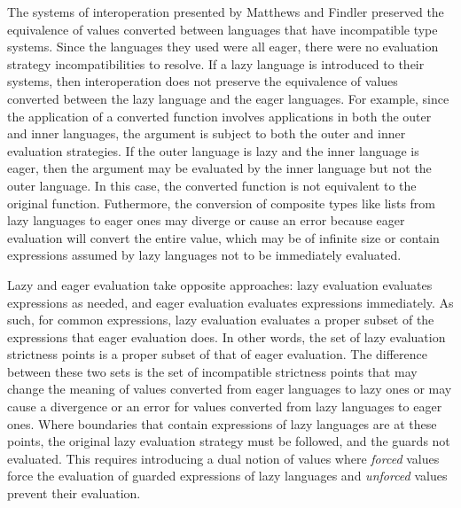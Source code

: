 The systems of interoperation presented by Matthews and Findler \cite{matthews07} preserved the equivalence of values converted between languages that have incompatible type systems. Since the languages they used were all eager, there were no evaluation strategy incompatibilities to resolve. If a lazy language is introduced to their systems, then interoperation does not preserve the equivalence of values converted between the lazy language and the eager languages. For example, since the application of a converted function involves applications in both the outer and inner languages, the argument is subject to both the outer and inner evaluation strategies. If the outer language is lazy and the inner language is eager, then the argument may be evaluated by the inner language but not the outer language. In this case, the converted function is not equivalent to the original function. Futhermore, the conversion of composite types like lists from lazy languages to eager ones may diverge or cause an error because eager evaluation will convert the entire value, which may be of infinite size or contain expressions assumed by lazy languages not to be immediately evaluated.

Lazy and eager evaluation take opposite approaches: lazy evaluation evaluates expressions as needed, and eager evaluation evaluates expressions immediately. As such, for common expressions, lazy evaluation evaluates a proper subset of the expressions that eager evaluation does. In other words, the set of lazy evaluation strictness points is a proper subset of that of eager evaluation. The difference between these two sets is the set of incompatible strictness points that may change the meaning of values converted from eager languages to lazy ones or may cause a divergence or an error for values converted from lazy languages to eager ones. Where boundaries that contain expressions of lazy languages are at these points, the original lazy evaluation strategy must be followed, and the guards not evaluated. This requires introducing a dual notion of values where \emph{forced} values force the evaluation of guarded expressions of lazy languages and \emph{unforced} values prevent their evaluation.